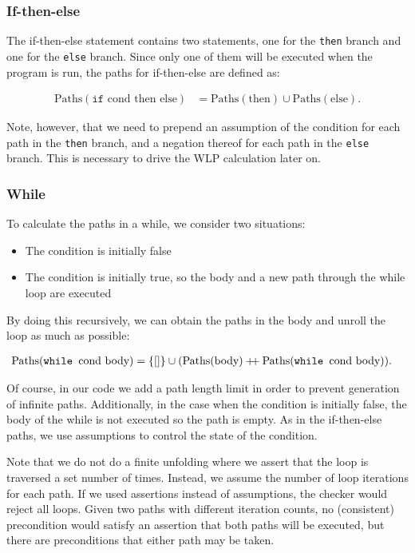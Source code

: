 \documentclass[a4paper]{article}
\newcommand\mdoubleplus{\ensuremath{\mathbin{+\mkern-5mu+}}}
\begin{document}
\subsubsection*{If-then-else}

The if-then-else statement contains two statements, one for the \texttt{then} branch
and one for the \texttt{else} branch. Since only one of them will be executed
when the program is run, the paths for if-then-else are defined as:

\begin{align*}
	\text{Paths}(\texttt{if } \text{cond } \text{then } \text{else}) &= \text{Paths}(\text{then}) \cup \text{Paths}(\text{else}).
\end{align*}

Note, however, that we need to prepend an assumption of the condition for each
path in the \texttt{then} branch, and a negation thereof for each path in the
\texttt{else} branch. This is necessary to drive the WLP calculation later on.

\subsubsection*{While}

To calculate the paths in a while, we consider two situations:

\begin{itemize}
\item The condition is initially false
\item The condition is initially true, so the body and a new path through
the while loop are executed
\end{itemize}

By doing this recursively, we can obtain the paths in the body and unroll the
loop as much as possible:

\begin{align*}
	\text{Paths}(\texttt{while } \text{cond } \text{body}) &= \{[]\} \cup (\text{Paths}(\text{body}) \mdoubleplus \text{Paths}(\texttt{while } \text{cond } \text{body}) ).
\end{align*}

Of course, in our code we add a path length limit in order to prevent generation
of infinite paths. Additionally, in the case when the condition is initially false,
the body of the while is not executed so the path is empty. As in the
if-then-else paths, we use assumptions to control the state of the condition.

Note that we do not do a finite unfolding where we assert that the loop is
traversed a set number of times. Instead, we assume the number of loop
iterations for each path. If we used assertions instead of assumptions, the
checker would reject all loops. Given two paths with different iteration counts,
no (consistent) precondition would satisfy an assertion that both paths will
be executed, but there are preconditions that either path may be taken.
\end{document}
